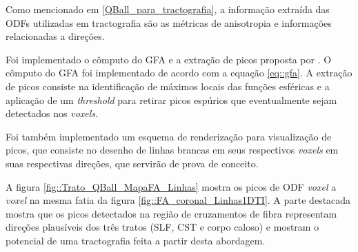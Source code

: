 \documentclass[
    12pt,                %
    oneside,            %
    a4paper,            %
    english,            %
    french,                %
    spanish,            %
    brazil                %
    ]{abntex2}
\begin{document}

Como mencionado em \ref{QBall_para_tractografia}, a informação extraída das ODFs utilizadas em tractografia são as métricas de anisotropia e informações relacionadas a direções.

Foi implementado o cômputo do GFA e a extração de picos proposta por . O cômputo do GFA foi implementado de acordo com a equação \ref{eq::gfa}. A extração de picos consiste na identificação de máximos locais das funções esféricas e a aplicação de um \textit{threshold} para retirar picos espúrios que eventualmente sejam detectados nos \textit{voxels}.

Foi também implementado um esquema de renderização para visualização de picos, que consiste no desenho de linhas brancas em seus respectivos \textit{voxels} em suas respectivas direções, que servirão de prova de conceito.


A figura \ref{fig::Trato_QBall_MapaFA_Linhas} mostra os picos de ODF \textit{voxel} a \textit{voxel} na mesma fatia da figura \ref{fig::FA_coronal_Linhas1DTI}. A parte destacada mostra que os picos detectados na região de cruzamentos de fibra representam direções plausíveis dos três tratos (SLF, CST e corpo caloso) e mostram o potencial de uma tractografia feita a partir desta abordagem.

%
\end{document}
